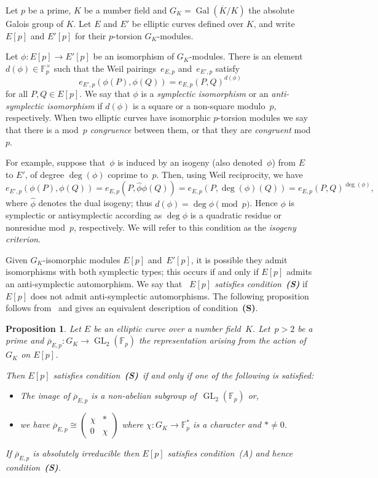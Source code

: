 \documentclass[12pt, reqno]{amsart}
\newcommand{\F}{\mathbb{F}}
\newcommand{\Kbar}{{\overline{K}}}
\newcommand{\rhobar}{{\overline{\rho}}}
\DeclareMathOperator{\Gal}{Gal}
\newcommand{\GL}{\operatorname{GL}}
\numberwithin{equation}{section}
\newtheorem{proposition}[theorem]{Proposition}
\theoremstyle{definition}
\theoremstyle{remark}
\newcommand{\condS}{condition~{\bf (S)}}
\begin{document}
Let $p$ be a prime, $K$ be a number field and $G_K = \Gal(\Kbar/K)$
the absolute Galois group of $K$.  Let $E$ and $E'$ be elliptic curves
defined over $K$, and write $E[p]$ and $E'[p]$ for their $p$-torsion
$G_K$-modules.

Let $\phi : E[p] \to E'[p]$ be an isomorphism of $G_K$-modules.  There
is an element $d(\phi) \in \F_p^\times$ such that the Weil
pairings~$e_{E,p}$ and~$e_{E',p}$ satisfy
\[
e_{E',p}(\phi(P), \phi(Q)) = e_{E,p}(P, Q)^{d(\phi)}
\]
for all $P, Q \in E[p]$.  We say that $\phi$ is a {\em symplectic
  isomorphism} or an {\em anti-symplectic isomorphism} if $d(\phi)$ is
a square or a non-square modulo~$p$, respectively.  When two elliptic
curves have isomorphic $p$-torsion modules we say that there is a
mod~$p$ {\em congruence} between them, or that they are {\em
  congruent} mod~$p$.

For example, suppose that~$\phi$ is induced by an isogeny (also
denoted~$\phi$) from $E$ to $E'$, of degree $\deg(\phi)$ coprime
to~$p$. Then, using Weil reciprocity,
we have
\[
  e_{E',p}(\phi(P), \phi(Q)) = e_{E,p}(P, \hat\phi\phi(Q)) =
  e_{E,p}(P, \deg(\phi)(Q)) = e_{E,p}(P, Q)^{\deg(\phi)},
  \]
  where $\hat{\phi}$ denotes the dual isogeny; 
  thus $d(\phi)=\deg\phi\pmod{p}$.
  Hence $\phi$ is symplectic or antisymplectic according as $\deg\phi$
is a quadratic residue or nonresidue mod~$p$, respectively.  We will refer to
this condition as the \emph{isogeny criterion}.

Given $G_K$-isomorphic modules $E[p]$ and~$E'[p]$, it is possible they
admit isomorphisms with both symplectic types; this occurs if and only
if $E[p]$ admits an anti-symplectic automorphism.  We say that
\emph{~$E[p]$ satisfies \condS} if $E[p]$ does not admit
anti-symplectic automorphisms. The following proposition follows
from~\cite{FKSym} and gives an equivalent description of
\condS.

\begin{proposition} \label{P:conditionS}
Let $E$ be an elliptic curve over a number field~$K$. Let~$p > 2$ be a prime and $\rhobar_{E,p} : G_K \to \GL_2(\F_p)$ the representation arising from the action of~$G_K$ on $E[p]$. 

Then $E[p]$ satisfies \condS\ if and only if one of the following is satisfied:
 \begin{itemize}
 \item[(A)] The image of $\rhobar_{E,p}$ is a non-abelian subgroup of~$\GL_2(\F_p)$ or,
 \item[(B)] we have $\rhobar_{E,p} \cong \left( \begin{smallmatrix} \chi & * \\ 0 & \chi \end{smallmatrix} \right)$ where $\chi : G_K \to \F_p^*$ is a character
 and $* \neq 0$.
 \end{itemize}
If $\rhobar_{E,p}$ is absolutely irreducible then $E[p]$ satisfies
condition~(A) and hence \condS.  \end{proposition}
\end{document}
